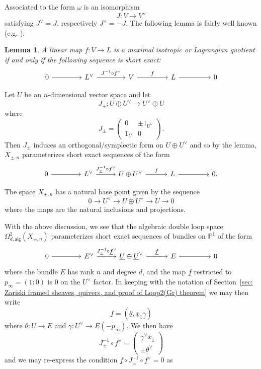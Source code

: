 \documentclass{amsart}
\newtheorem{lemma}[theorem]{Lemma}
\theoremstyle{definition}
\newcommand{\PP}{\mathbb{P}}
\newcommand{\UL}[1]{\underline{#1}}
\newcommand{\alg}{\mathsf{alg}}
\newcommand{\LoopTwo}{\Omega^{2}_{d,\alg}}
\newcommand{\Xpm}{X_{\pm,n}}
\begin{document}
Associated to the form $\omega$ is an isomorphism
\[
J : V\to V^{\vee } 
\]
satisfying $J^{\vee} = J$, respectively $J^{\vee}=-J$. The following
lemma is fairly well known (e.g. \cite[\S 2]{Hitching-2007}):
\begin{lemma}\label{lem: lagrangian quotient condition as a ses}
A linear map $f:V\to L$ is a maximal isotropic or Lagrangian quotient if
and only if the following sequence is short exact:
\[
\begin{tikzcd}[column sep={6em,between origins}]
0 \arrow[r] &
L^{\vee } \arrow[r, "J^{-1}\circ f^{\vee}"] &
V \arrow[r, "f"] &
L \arrow[r] &
0
\end{tikzcd}
\]
\end{lemma}


Let $U$ be an $n$-dimensional vector space and let 
\[
J_{\pm}: U\oplus U^{\vee} \to U^{\vee}\oplus U
\]
where 
\[
J_{\pm} = \begin{pmatrix}
        0 & \pm 1_{U^{\vee }}\\
        1_{U} & 0
      \end{pmatrix}.
\]
Then $J_{\pm}$ induces an orthogonal/symplectic form on $U\oplus
U^{\vee}$ and so by the lemma, $\Xpm$ parameterizes short exact
sequences of the form
\[
\begin{tikzcd}[column sep={6em,between origins}]
0 \arrow[r] &
L^{\vee } \arrow[r, "J_{\pm }^{-1}\circ f^{\vee}"] &
U\oplus U^{\vee } \arrow[r, "f"] &
L \arrow[r] &
0.
\end{tikzcd}
\]

The space $\Xpm$ has a natural base point given by the sequence
\[
0\to U^{\vee}\to U\oplus U^{\vee} \to U\to 0
\]
where the maps are the natural inclusions and projections.

With the above discussion, we see that the algebraic double loop space
$\LoopTwo(\Xpm )$ parameterizes short exact sequences of
bundles on $\PP^{1}$ of the form
\begin{equation}\label{eqn: Evee-->U+Uvee-->E}
\begin{tikzcd}[column sep={6em,between origins}]
0 \arrow[r] &
E^{\vee } \arrow[r, "J_{\pm }^{-1}\circ \UL{f}^{\vee}"] &
\UL{U}\oplus \UL{U}^{\vee } \arrow[r, "\UL{f}"] &
E \arrow[r] &
0
\end{tikzcd}
\end{equation}
where the bundle $E$ has rank $n$ and degree $d$, and the map $\UL{f}$
restricted to $p_{\infty} = (1:0)$ is 0 on the $U^{\vee}$ factor. In
keeping with the notation of Section~\ref{sec: Zariski framed sheaves,
quivers, and proof of Loop2(Gr) theorem} we may then write
\[
\UL{f} = (\UL{\theta},\UL{x}_{1}\UL{\gamma})
\]
where $\UL{\theta}:\UL{U}\to E$ and $\UL{\gamma}:\UL{U}^{\vee}\to
E(-p_{\infty}).$ We then have
\[
J_{\pm}^{-1}\circ \UL{f}^{\vee} = \begin{pmatrix} \UL{\gamma}^{\vee}\UL{x}_{1} \\
\pm \UL{\theta}^{\vee}  \end{pmatrix}
\]
and we may re-express the condition $\UL{f}\circ J_{\pm}^{-1}\circ
\UL{f}^{\vee}=0$ as
\end{document}
